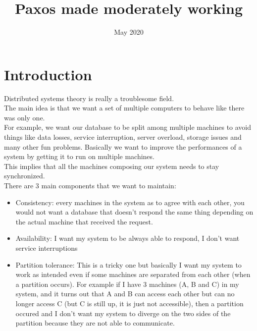 \documentclass{article}
\title{Paxos made moderately working}
\date{May 2020}
\begin{document}
\maketitle
\tableofcontents
\pagebreak

\section{Introduction}
Distributed systems theory is really a troublesome field.\\
The main idea is that we want a set of multiple computers to behave like there was only one.\\
For example, we want our database to be split among multiple machines to avoid things like data losses, service interruption, server overload, storage issues and many other fun problems. Basically we want to improve the performances of a system by getting it to run on multiple machines.\\
This implies that all the machines composing our system needs to stay synchronized.\\
There are 3 main components that we want to maintain:
\begin{itemize}
    \item Consistency: every machines in the system as to agree with each other, you would not want a database that doesn't respond the same thing depending on the actual machine that received the request.
    \item Availability: I want my system to be always able to respond, I don't want service interruptions
    \item Partition tolerance: This is a tricky one but basically I want my system to work as intended even if some machines are separated from each other (when a partition occurs). For example if I have 3 machines (A, B and C) in my system, and it turns out that A and B can access each other but can no longer access C (but C is still up, it is just not accessible), then a partition occured and I don't want my system to diverge on the two sides of the partition because they are not able to communicate.
\end{itemize}
\end{document}
